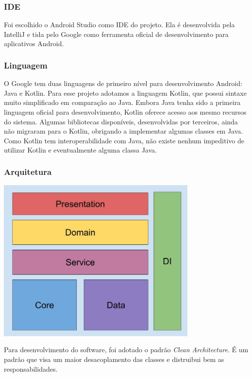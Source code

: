 \documentclass[a4paper, 12pt]{article}
\begin{document}
\subsubsection{IDE}

Foi escolhido o Android Studio como IDE do projeto. Ela é desenvolvida pela IntelliJ e tida pelo Google como ferramenta oficial de desenvolvimento para aplicativos Android.

\subsubsection{Linguagem}

O Google tem duas linguagens de primeiro nível para desenvolvimento Android: Java e Kotlin. Para esse projeto adotamos a linguagem Kotlin, que possui sintaxe muito simplificado em comparação ao Java. Embora Java tenha sido a primeira linguagem oficial para desenvolvimento, Kotlin oferece acesso aos mesmo recursos do sistema.
Algumas bibliotecas disponíveis, desenvolvidas por terceiros, ainda não migraram para o Kotlin, obrigando a implementar algumas classes em Java. Como Kotlin tem interoperabilidade com Java, não existe nenhum impeditivo de utilizar Kotlin e eventualmente alguma classa Java.

\subsubsection{Arquitetura}

\includegraphics[width=10cm, center]{images/brick_diagram_beacon}

Para desenvolvimento do software, foi adotado o padrão \textit{Clean Architecture}. É um padrão que visa um maior desacoplamento das classes e distruibui bem as responsabilidades.
\end{document}
